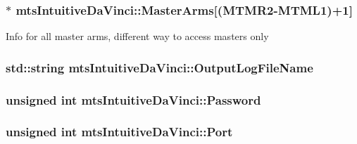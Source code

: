 \subsubsection[{Master\+Arms}]{$\ast$ mts\+Intuitive\+Da\+Vinci\+::\+Master\+Arms\mbox{[}({\bf M\+T\+M\+R2}-\/{\bf M\+T\+M\+L1})+1\mbox{]}\hspace{0.3cm}{\ttfamily [protected]}}\label{classmts_intuitive_da_vinci_aca2410ba38bf0ad7fce1481f8701c1da}
Info for all master arms, different way to access masters only \hypertarget{classmts_intuitive_da_vinci_a15ff830a81df5f1a4567de780f88e929}{}
\subsubsection[{Output\+Log\+File\+Name}]{\setlength{\rightskip}{0pt plus 5cm}std\+::string mts\+Intuitive\+Da\+Vinci\+::\+Output\+Log\+File\+Name\hspace{0.3cm}{\ttfamily [protected]}}\label{classmts_intuitive_da_vinci_a15ff830a81df5f1a4567de780f88e929}
\hypertarget{classmts_intuitive_da_vinci_a91a1a1c9fd5b0e0717257aa00c29c687}{}
\subsubsection[{Password}]{\setlength{\rightskip}{0pt plus 5cm}unsigned int mts\+Intuitive\+Da\+Vinci\+::\+Password\hspace{0.3cm}{\ttfamily [protected]}}\label{classmts_intuitive_da_vinci_a91a1a1c9fd5b0e0717257aa00c29c687}
\hypertarget{classmts_intuitive_da_vinci_a62f779011990ec7e02ddc7800d933e23}{}
\subsubsection[{Port}]{\setlength{\rightskip}{0pt plus 5cm}unsigned int mts\+Intuitive\+Da\+Vinci\+::\+Port\hspace{0.3cm}{\ttfamily [protected]}}\label{classmts_intuitive_da_vinci_a62f779011990ec7e02ddc7800d933e23}
\hypertarget{classmts_intuitive_da_vinci_a1780b24f6582c60ff94f2e1d03ef7060}{}

